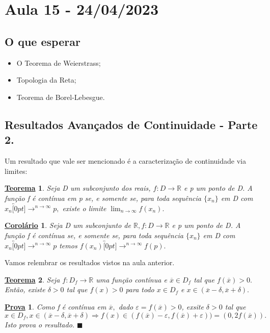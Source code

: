 \documentclass{article}
\newtheorem*{theorem*}{\underline{Teorema}}
\newtheorem*{proof*}{\underline{Prova}}
\newtheorem*{crl*}{\underline{Corol\'ario}}
\renewcommand\qedsymbol{$\blacksquare$}
\begin{document}
\section{Aula 15 - 24/04/2023}
\subsection{O que esperar}
\begin{itemize}
  \item O Teorema de Weierstrass;
  \item Topologia da Reta;
  \item Teorema de Borel-Lebesgue.
\end{itemize}
\subsection{Resultados Avan\c cados de Continuidade - Parte 2.}
  Um resultado que vale ser mencionado \'e a caracteriza\c c\~ao de continuidade via limites:
 \begin{theorem*}
   Seja D um subconjunto dos reais, $f:D\rightarrow \mathbb{R}$ e p um ponto de D. A fun\c c\~ao f \'e cont\'inua em p se, e somente
   se, para toda sequ\^encia $\{x_{n}\}$ em D com $x_{n}\overbracket[0pt]{\longrightarrow}^{n\to \infty}p,$ existe o limite $\lim_{n\to \infty}f(x_{n}).$
 \end{theorem*}
\begin{crl*}
  Seja D um subconjunto de $\mathbb{R}, f:D\rightarrow \mathbb{R} $ e p um ponto de D. A fun\c c\~ao f \'e cont\'inua se, e somente
  se, para toda sequ\^encia $\{x_{n}\}$ em D com $x_{n}\overbracket[0pt]{\longrightarrow}^{n\to \infty}p$ temos $f(x_{n})\overbracket[0pt]{\longrightarrow}^{n\to \infty}f(p).$
\end{crl*}
Vamos relembrar os resultados vistos na aula anterior.
 \begin{theorem*}
   Seja $f:D_{f}\rightarrow \mathbb{R}$ uma fun\c c\~ao cont\'inua e $\overline{x}\in D_{f}$ tal que $f(\overline{x})>0.$ 
   Ent\~ao, existe $\delta>0$ tal que $f(x)>0$ para todo $x\in D_{f}$ e $x\in(\overline{x}-\delta, \overline{x}+\delta).$
 \end{theorem*}
 \begin{proof*}
   Como f \'e cont\'inua em $\overline{x},$ dado $\varepsilon = f(\overline{x}) >0$, exsite $\delta > 0$ tal que 
     $$
       x\in D_{f}, x\in(\overline{x}-\delta, \overline{x}+\delta) \Rightarrow f(x)\in (f(\overline{x})-\varepsilon, f(\overline{x})+\varepsilon)) =
  (0, 2f(\overline{x})).
     $$
     Isto prova o resultado. \qedsymbol
 \end{proof*}
\end{document}
